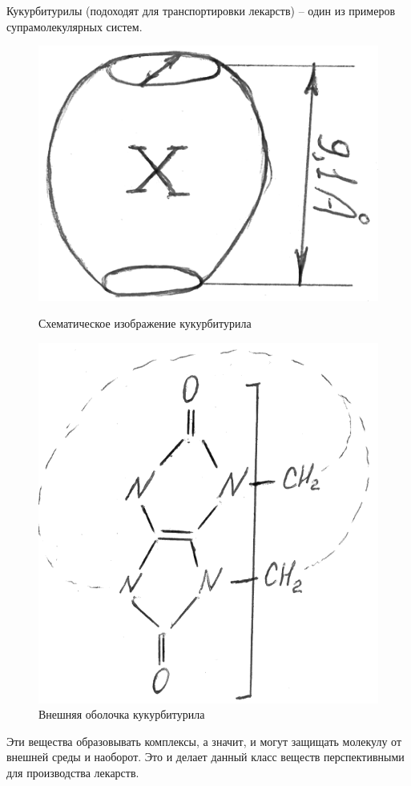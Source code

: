 \begin{lecture}
\begin{lecSection}
		\begin{lecSection}
			Кукурбитурилы (подоходят для транспортировки лекарств) -- один из примеров супрамолекулярных систем.
			\begin{figure}[H]
				\begin{minipage}[h]{0.48\linewidth}
					\centering\includegraphics[width=\linewidth]{lecture_08/new_kukur_scheme}
					\caption{Схематическое изображение кукурбитурила}
				\end{minipage}
				\hfill
				\begin{minipage}[h]{0.48\linewidth}
					\centering\includegraphics[width=0.8\linewidth]{lecture_08/new_kukur_border}
					\caption{Внешняя оболочка кукурбитурила}
				\end{minipage}
				\hfill
			\end{figure}
		
			Эти вещества образовывать комплексы, а значит, и могут защищать молекулу от внешней среды и наоборот. Это и делает данный класс веществ перспективными для производства лекарств.
		\end{lecSection}
	\end{lecSection}
	
\end{lecture}
